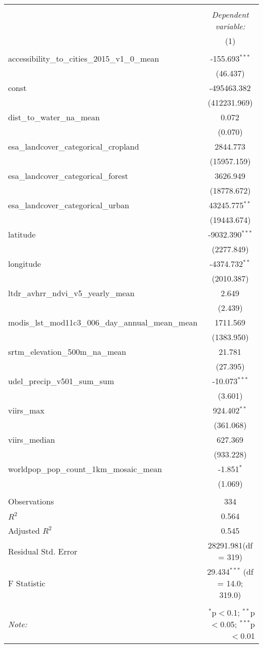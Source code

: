 \begin{table}[!htbp] \centering
\begin{tabular}{@{\extracolsep{5pt}}lc}
\\[-1.8ex]\hline
\hline \\[-1.8ex]
& \multicolumn{1}{c}{\textit{Dependent variable:}} \
\cr \cline{1-2}
\\[-1.8ex] & (1) \\
\hline \\[-1.8ex]
 accessibility_to_cities_2015_v1_0_mean & -155.693$^{***}$ \\
  & (46.437) \\
 const & -495463.382$^{}$ \\
  & (412231.969) \\
 dist_to_water_na_mean & 0.072$^{}$ \\
  & (0.070) \\
 esa_landcover_categorical_cropland & 2844.773$^{}$ \\
  & (15957.159) \\
 esa_landcover_categorical_forest & 3626.949$^{}$ \\
  & (18778.672) \\
 esa_landcover_categorical_urban & 43245.775$^{**}$ \\
  & (19443.674) \\
 latitude & -9032.390$^{***}$ \\
  & (2277.849) \\
 longitude & -4374.732$^{**}$ \\
  & (2010.387) \\
 ltdr_avhrr_ndvi_v5_yearly_mean & 2.649$^{}$ \\
  & (2.439) \\
 modis_lst_mod11c3_006_day_annual_mean_mean & 1711.569$^{}$ \\
  & (1383.950) \\
 srtm_elevation_500m_na_mean & 21.781$^{}$ \\
  & (27.395) \\
 udel_precip_v501_sum_sum & -10.073$^{***}$ \\
  & (3.601) \\
 viirs_max & 924.402$^{**}$ \\
  & (361.068) \\
 viirs_median & 627.369$^{}$ \\
  & (933.228) \\
 worldpop_pop_count_1km_mosaic_mean & -1.851$^{*}$ \\
  & (1.069) \\
\hline \\[-1.8ex]
 Observations & 334 \\
 $R^2$ & 0.564 \\
 Adjusted $R^2$ & 0.545 \\
 Residual Std. Error & 28291.981(df = 319)  \\
 F Statistic & 29.434$^{***}$ (df = 14.0; 319.0) \\
\hline
\hline \\[-1.8ex]
\textit{Note:} & \multicolumn{1}{r}{$^{*}$p$<$0.1; $^{**}$p$<$0.05; $^{***}$p$<$0.01} \\
\end{tabular}
\end{table}